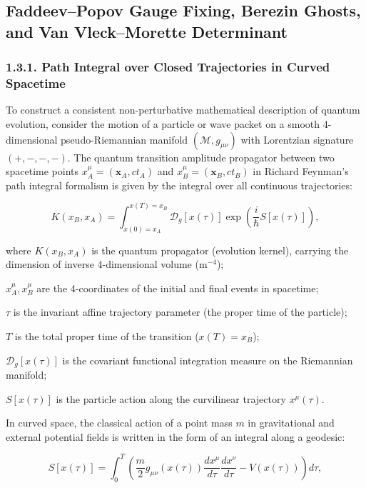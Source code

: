 \subsection{Faddeev--Popov Gauge Fixing, Berezin Ghosts, and Van Vleck--Morette Determinant}\label{sec:1.3}

\subsubsection{1.3.1. Path Integral over Closed Trajectories in Curved Spacetime}\label{sec:1.3.1}

To construct a consistent non-perturbative mathematical description of quantum evolution, consider the motion of a particle or wave packet on a smooth 4-dimensional pseudo-Riemannian manifold $(\mathcal{M}, g_{\mu\nu})$ with Lorentzian signature $(+,-,-,-)$. The quantum transition amplitude propagator between two spacetime points $x_A^\mu = (\mathbf{x}_A, ct_A)$ and $x_B^\mu = (\mathbf{x}_B, ct_B)$ in Richard Feynman's path integral formalism is given by the integral over all continuous trajectories:

\begin{equation}\label{eq:1.33}\tag{1.33}
K(x_B, x_A) = \int_{x(0)=x_A}^{x(T)=x_B} \mathcal{D}_g[x(\tau)] \exp\left( \frac{i}{\hbar} S[x(\tau)] \right),
\end{equation}

where $K(x_B, x_A)$ is the quantum propagator (evolution kernel), carrying the dimension of inverse 4-dimensional volume ($\text{m}^{-4}$);  

$x_A^\mu, x_B^\mu$ are the 4-coordinates of the initial and final events in spacetime;  

$\tau$ is the invariant affine trajectory parameter (the proper time of the particle);  

$T$ is the total proper time of the transition ($x(T) = x_B$);  

$\mathcal{D}_g[x(\tau)]$ is the covariant functional integration measure on the Riemannian manifold;  

$S[x(\tau)]$ is the particle action along the curvilinear trajectory $x^\mu(\tau)$.

In curved space, the classical action of a point mass $m$ in gravitational and external potential fields is written in the form of an integral along a geodesic:

\begin{equation}\label{eq:1.34}\tag{1.34}
S[x(\tau)] = \int_0^T \left( \frac{m}{2} g_{\mu\nu}(x(\tau)) \frac{dx^\mu}{d\tau} \frac{dx^\nu}{d\tau} - V(x(\tau)) \right) d\tau,
\end{equation}

